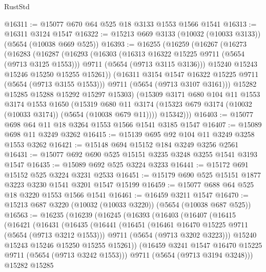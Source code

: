 \begin{lexlean}{RustStd}
\begin{coremodule}
@16311 := @15077 @670 @64 @525 @18 @3133 @1553 @1566 @1541
@16313 := @16311 @3124 @1547
@16322 := @15213 @669 @3133 (@10032 (@10033 @3133)) (@5654 (@10038 @669 @525))
@16393 := @16255
    (@16259
      (@16267
        (@16273
          (@16283
            (@16287
              (@16293
                (@16303
                  (@16313 @16322 @15225 @9711 (@5654 (@9713 @3125 @1553)))
                  @9711
                  (@5654 (@9713 @3115 @3136)))
                @15240
                @15243
                @15246
                @15250
                @15255
                @15261))
            (@16311 @3154 @1547 @16322 @15225 @9711 (@5654 (@9713 @3155 @1553)))
            @9711
            (@5654 (@9713 @3107 @3161)))
          @15282
          @15285
          @15288
          @15292
          @15297
          @15303)
        (@15309
          @3171
          @680
          @104
          @11
          @1553
          @3174
          @1553
          @1650
          (@15319
            @680
            @11
            @3174
            (@15323 @679 @3174 (@10032 (@10033 @3174)) (@5654 (@10038 @679 @11))))
          @15342)))
@16403 := @15077 @698 @64 @11 @18 @3264 @1553 @1566 @1541 @3185 @1547
@16407 := @15089 @698 @11 @3249 @3262
@16415 := @15139 @695 @92 @104 @11 @3249 @3258 @1553 @3262
@16421 := @15148 @694 @15152 @184 @3249 @3256 @2561
@16431 := @15077 @692 @690 @525 @15151 @3235 @3248 @3255 @1541 @3193 @1547
@16435 := @15089 @692 @525 @3224 @3233
@16441 := @15172 @691 @15152 @525 @3224 @3231 @2533
@16451 := @15179 @690 @525 @15151 @1877 @3223 @3230 @1541 @3201 @1547 @15199
@16459 := @15077 @688 @64 @525 @18 @3220 @1553 @1566 @1541
@16461 := @16459 @3211 @1547
@16470 := @15213 @687 @3220 (@10032 (@10033 @3220)) (@5654 (@10038 @687 @525))
@16563 := @16235
    (@16239
      (@16245
        (@16393
          (@16403
            (@16407
              (@16415
                (@16421
                  (@16431
                    (@16435
                      (@16441
                        (@16451
                          (@16461 @16470 @15225 @9711 (@5654 (@9713 @3212 @1553)))
                          @9711
                          (@5654 (@9713 @3202 @3223)))
                        @15240
                        @15243
                        @15246
                        @15250
                        @15255
                        @15261))
                    (@16459 @3241 @1547 @16470 @15225 @9711 (@5654 (@9713 @3242 @1553)))
                    @9711
                    (@5654 (@9713 @3194 @3248)))
                  @15282
                  @15285

\end{coremodule}
\end{lexlean}
